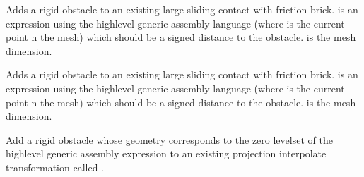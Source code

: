 \documentclass[a4paper,11pt,english]{sphinxmanual}
\begin{document}
\begin{fulllineitems}
\begin{fulllineitems}
\end{fulllineitems}


\begin{fulllineitems}
\label{\detokenize{python/cmdref_Model:getfem.Model.add_rigid_obstacle_to_Nitsche_large_sliding_contact_brick}}
Adds a rigid obstacle to an existing large sliding contact
with friction brick.  is an expression using the high\sphinxhyphen{}level
generic assembly language (where  is the current point n the mesh)
which should be a signed distance to the obstacle.
 is the mesh dimension.

\end{fulllineitems}


\begin{fulllineitems}
\label{\detokenize{python/cmdref_Model:getfem.Model.add_rigid_obstacle_to_large_sliding_contact_brick}}
Adds a rigid obstacle to an existing large sliding contact
with friction brick.  is an expression using the high\sphinxhyphen{}level
generic assembly language (where  is the current point n the mesh)
which should be a signed distance to the obstacle.
 is the mesh dimension.

\end{fulllineitems}


\begin{fulllineitems}
\label{\detokenize{python/cmdref_Model:getfem.Model.add_rigid_obstacle_to_projection_transformation}}
Add a rigid obstacle whose geometry corresponds to the zero level\sphinxhyphen{}set
of the high\sphinxhyphen{}level generic assembly expression 
to an existing projection interpolate transformation called .


\end{fulllineitems}
\end{fulllineitems}
\end{document}
